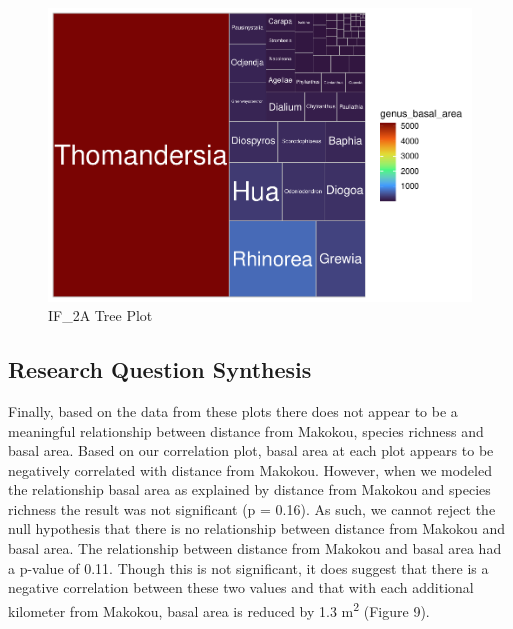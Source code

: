 \documentclass[
  12pt,
]{article}
\begin{document}
\begin{figure}
\centering
\includegraphics{GoldenGriffithsKnierMalinowski_ENV872_Project_files/figure-latex/unnamed-chunk-11-1.pdf}
\caption{IF\_2A Tree Plot}
\end{figure}

\newpage

\hypertarget{research-question-synthesis-1}{%
\subsection{Research Question
Synthesis}\label{research-question-synthesis-1}}

Finally, based on the data from these plots there does not appear to be
a meaningful relationship between distance from Makokou, species
richness and basal area. Based on our correlation plot, basal area at
each plot appears to be negatively correlated with distance from
Makokou. However, when we modeled the relationship basal area as
explained by distance from Makokou and species richness the result was
not significant (p = 0.16). As such, we cannot reject the null
hypothesis that there is no relationship between distance from Makokou
and basal area. The relationship between distance from Makokou and basal
area had a p-value of 0.11. Though this is not significant, it does
suggest that there is a negative correlation between these two values
and that with each additional kilometer from Makokou, basal area is
reduced by 1.3 m\textsuperscript{2} (Figure 9).
\end{document}

